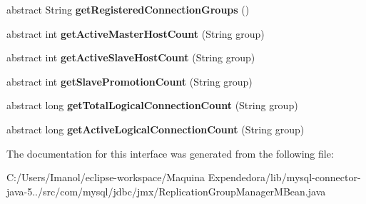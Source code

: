 \begin{DoxyCompactItemize}
\mbox{\label{interfacecom_1_1mysql_1_1jdbc_1_1jmx_1_1_replication_group_manager_m_bean_ac8cad4df1bf558acb4e71741f678fcb2}} 
abstract String {\bfseries get\+Registered\+Connection\+Groups} ()
\item 
\mbox{\label{interfacecom_1_1mysql_1_1jdbc_1_1jmx_1_1_replication_group_manager_m_bean_ab7eaf1559fa6ecaac3449e5e25615be4}} 
abstract int {\bfseries get\+Active\+Master\+Host\+Count} (String group)
\item 
\mbox{\label{interfacecom_1_1mysql_1_1jdbc_1_1jmx_1_1_replication_group_manager_m_bean_a812b06cb92bfe09cfb369c85a65333c5}} 
abstract int {\bfseries get\+Active\+Slave\+Host\+Count} (String group)
\item 
\mbox{\label{interfacecom_1_1mysql_1_1jdbc_1_1jmx_1_1_replication_group_manager_m_bean_a1d27f2850445df43c27f11f52a48a7fa}} 
abstract int {\bfseries get\+Slave\+Promotion\+Count} (String group)
\item 
\mbox{\label{interfacecom_1_1mysql_1_1jdbc_1_1jmx_1_1_replication_group_manager_m_bean_a22a3a6368292a3613aa49db8a6173aa2}} 
abstract long {\bfseries get\+Total\+Logical\+Connection\+Count} (String group)
\item 
\mbox{\label{interfacecom_1_1mysql_1_1jdbc_1_1jmx_1_1_replication_group_manager_m_bean_a77876774076f74e3317287c0bf073933}} 
abstract long {\bfseries get\+Active\+Logical\+Connection\+Count} (String group)
\end{DoxyCompactItemize}


The documentation for this interface was generated from the following file\+:\begin{DoxyCompactItemize}
\item 
C\+:/\+Users/\+Imanol/eclipse-\/workspace/\+Maquina Expendedora/lib/mysql-\/connector-\/java-\/5../src/com/mysql/jdbc/jmx/Replication\+Group\+Manager\+M\+Bean.\+java\end{DoxyCompactItemize}
